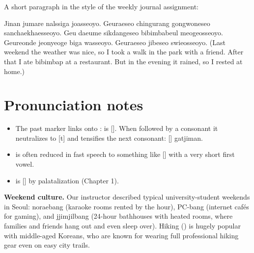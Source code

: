 \begin{example}
A short paragraph in the style of the weekly journal assignment:
\begin{quote}
\end{quote}
Jinan jumare nalssiga joasseoyo. Geuraeseo chingurang gongwoneseo sanchaekhaesseoyo. Geu
daeume sikdangeseo bibimbabeul meogeosseoyo. Geureonde jeonyeoge biga wasseoyo.
Geuraeseo jibeseo swieosseoyo. (Last weekend the weather was nice, so I took a walk in
the park with a friend. After that I ate bibimbap at a restaurant. But in the evening it
rained, so I rested at home.)
\end{example}

\section{Pronunciation notes}

\begin{itemize}
  \item The past marker  links onto :  is []. When
        followed by a consonant it neutralizes to [t] and tensifies the next consonant:
         [] gatjiman.
  \item {} is often reduced in fast speech to something like [] with
        a very short first vowel.
  \item {} is [] by palatalization (Chapter 1).
\end{itemize}

\begin{aside}
\textbf{Weekend culture.} Our instructor described typical university-student weekends in
Seoul:  noraebang (karaoke rooms rented by the hour),  PC-bang
(internet caf\'es for gaming), and  jjimjilbang (24-hour bathhouses with
heated rooms, where families and friends hang out and even sleep over). Hiking
() is hugely popular with middle-aged Koreans, who are known for wearing full
professional hiking gear even on easy city trails.
\end{aside}

